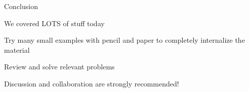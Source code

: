 \documentclass[13pt,onlymath]{beamer}
\begin{document}
\begin{frame}[fragile]{Conclusion}
\BIT
\item We covered LOTS of stuff today
\BIT
\item Try many small examples with pencil and paper to completely internalize the material
\item Review and solve relevant problems
\EIT
\vfill
\item Discussion and collaboration are strongly recommended!
\EIT
\end{frame}
\end{document}
